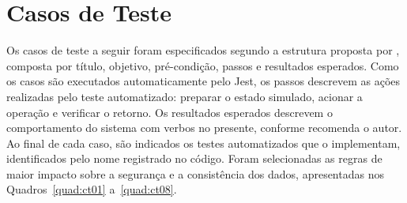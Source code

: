 \section{Casos de Teste}
\label{sec:casosDeTeste}

Os casos de teste a seguir foram especificados segundo a estrutura proposta por , composta por título, objetivo, pré-condição, passos e resultados esperados. Como os casos são executados automaticamente pelo Jest, os passos descrevem as ações realizadas pelo teste automatizado: preparar o estado simulado, acionar a operação e verificar o retorno. Os resultados esperados descrevem o comportamento do sistema com verbos no presente, conforme recomenda o autor. Ao final de cada caso, são indicados os testes automatizados que o implementam, identificados pelo nome registrado no código. Foram selecionadas as regras de maior impacto sobre a segurança e a consistência dos dados, apresentadas nos Quadros~\ref{quad:ct01} a~\ref{quad:ct08}.

